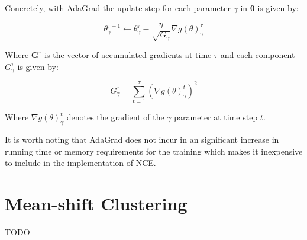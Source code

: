 Concretely, with AdaGrad the update step for each parameter $\gamma$ in $\boldsymbol{\theta}$ is given by:

\begin{equation}
\theta^{\tau + 1}_{\gamma} \leftarrow \theta^{\tau}_{\gamma} - \frac{\eta}{\sqrt{G_{\gamma}}} \nabla g(\theta)^{\tau}_{\gamma}
\end{equation}

Where $\mathbf{G}^{\tau}$ is the vector of accumulated gradients at time $\tau$ and each component $G^{\tau}_\gamma$ is given by:

\begin{equation}
G^{\tau}_{\gamma} = \sum_{t=1}^{\tau} \left(\nabla g(\theta)^{t}_{\gamma}\right)^{2}
\label{eq:adagrad-g}
\end{equation}

Where $\nabla g(\theta)^{t}_{\gamma}$ denotes the gradient of the $\gamma$ parameter at time step $t$.

It is worth noting that AdaGrad does not incur in an significant increase in running time or memory requirements for the training which makes it inexpensive to include in the implementation of NCE.

\section{Mean-shift Clustering}

TODO
